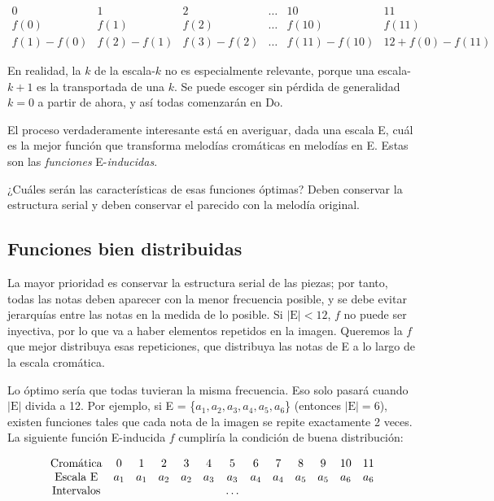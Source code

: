 		\[\left.\begin{matrix}
		0&1&2&\ldots&10&11\\
		f(0)&f(1)&f(2)&\ldots&f(10)&f(11)\\
		f(1)-f(0)&f(2)-f(1)&f(3)-f(2)&\ldots&f(11)-f(10)&12+f(0)-f(11)
		\end{matrix}\right.\]
		
		En realidad, la $k$ de la escala-$k$ no es especialmente relevante, porque una escala-$k+1$ es la transportada de una $k$. Se puede escoger sin pérdida de generalidad $k=0$ a partir de ahora, y así todas comenzarán en Do.
		
		El proceso verdaderamente interesante está en averiguar, dada una escala E, cuál es la mejor función que transforma melodías cromáticas en melodías en E. Estas son las \textit{funciones} E-\textit{inducidas}.
		
		¿Cuáles serán las características de esas funciones óptimas? Deben conservar la estructura serial y deben conservar el parecido con la melodía original.
		
	\subsection{Funciones bien distribuidas}
		
		La mayor prioridad es conservar la estructura serial de las piezas; por tanto, todas las notas deben aparecer con la menor frecuencia posible, y se debe evitar jerarquías entre las notas en la medida de lo posible. Si $|\text{E}|<12$, $f$ no puede ser inyectiva, por lo que va a haber elementos repetidos en la imagen. Queremos la $f$ que mejor distribuya esas repeticiones, que distribuya las notas de E a lo largo de la escala cromática.
		
		Lo óptimo sería que todas tuvieran la misma frecuencia. Eso solo pasará cuando $|\text{E}|$ divida a 12. Por ejemplo, si E = \{$a_1,a_2,a_3,a_4,a_5,a_6$\} (entonces $|\text{E}|=6$), existen funciones tales que cada nota de la imagen se repite exactamente 2 veces. La siguiente función E-inducida $f$ cumpliría la condición de buena distribución:
				
		\[\left.\begin{array}{*{13}c}
		\text{Cromática}&0&1&2&3&4&5&6&7&8&9&10&11\\
		\text{Escala E}&a_1&a_1&a_2&a_2&a_3&a_3&a_4&a_4&a_5&a_5&a_6&a_6\\
		\text{Intervalos}&&&&&&\ldots\\
		\end{array}\right.\]
		
